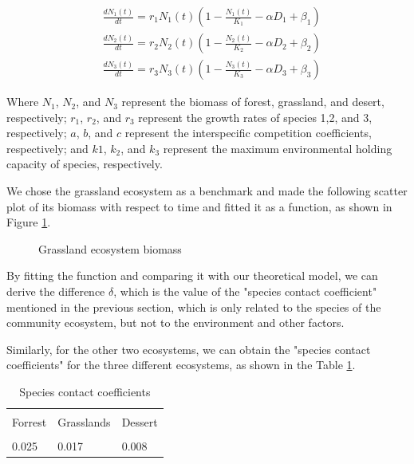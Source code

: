 \documentclass[12pt]{article}
\begin{document}
\begin{equation}
	\left .
	\begin{aligned}
		 & \frac{dN_1(t)}{dt} = r_1N_1(t)(1-\frac{N_1(t)}{K_1} - \alpha D_1 + \beta_1) \\
		 & \frac{dN_2(t)}{dt} = r_2N_2(t)(1-\frac{N_2(t)}{K_2} - \alpha D_2 + \beta_2) \\
		 & \frac{dN_3(t)}{dt} = r_3N_3(t)(1-\frac{N_3(t)}{K_3} - \alpha D_3 + \beta_3)
	\end{aligned}
	\right .
\end{equation}

Where $N_1$, $N_2$, and $N_3$ represent the biomass of forest, grassland, and desert, respectively; $r_1$, $r_2$, and $r_3$ represent the growth rates of species 1,2, and 3, respectively; $a$, $b$, and $c$ represent the interspecific competition coefficients, respectively; and $k1$, $k_2$, and $k_3$ represent the maximum environmental holding capacity of species, respectively.

We chose the grassland ecosystem as a benchmark and made the following scatter plot of its biomass with respect to time and fitted it as a function, as shown in Figure \ref{fig:biomass}.

\begin{figure}[htb]
	\centering
	
	\caption{Grassland ecosystem biomass}
	\label{fig:biomass}
\end{figure}

By fitting the function and comparing it with our theoretical model, we can derive the difference $\delta$, which is the value of the "species contact coefficient" mentioned in the previous section, which is only related to the species of the community ecosystem, but not to the environment and other factors.

Similarly, for the other two ecosystems, we can obtain the "species contact coefficients" for the three different ecosystems, as shown in the Table \ref{tab:contact}.


\begin{table}[htb]
	\centering
	\caption{Species contact coefficients}
	\begin{tabular}{@{}lll@{}}
		\toprule                       \\
		Forrest & Grasslands & Dessert \\
		\midrule                       \\
		0.025   & 0.017      & 0.008   \\
		\bottomrule
	\end{tabular}
	\label{tab:contact}
\end{table}
\end{document}
